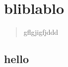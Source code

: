 \documentclass[]{article}
\title{}
\author{}
\begin{document}
\chapter{bliblablo}

\begin{abstract}
gflgjigfjddd
\end{abstract}

\section{hello}
\end{document}
